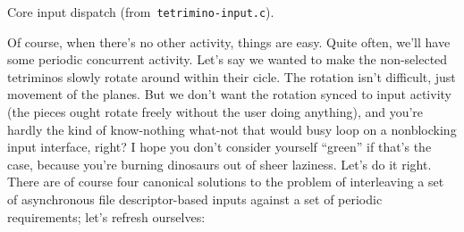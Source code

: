 \begin{listing}[!htbp]
\inputminted[]{C}{code/tetrimino-inputcore.h}
\caption{Core input dispatch (from~\texttt{tetrimino-input.c}).}
\label{list:tetrimino-inputcore}
\end{listing}

Of course, when there's no other activity, things are easy. Quite often, we'll
have some periodic concurrent activity. Let's say we wanted to make the non-selected
tetriminos slowly rotate around within their cicle. The rotation isn't
difficult, just movement of the planes. But we don't want the rotation synced
to input activity (the pieces ought rotate freely without the user doing
anything), and you're hardly the kind of know-nothing what-not that
would busy loop on a nonblocking input interface, right? I hope you don't
consider yourself ``green'' if that's the case, because you're burning
dinosaurs out of sheer laziness. Let's do it right. There are of course four
canonical solutions to the problem of interleaving a set of asynchronous file
descriptor-based inputs against a set of periodic requirements; let's refresh
ourselves:

